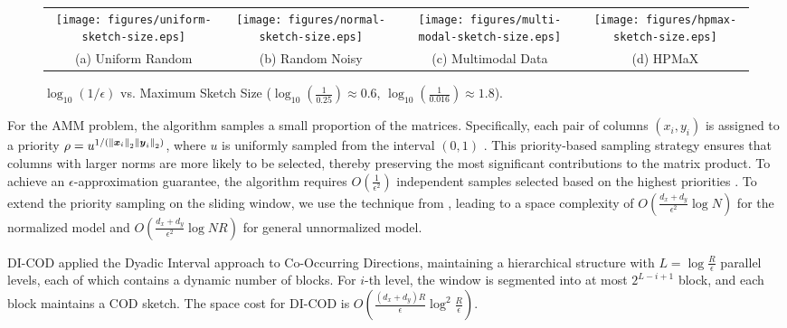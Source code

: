 \begin{figure*}[t]
	\centering
 \vspace{-2mm}
		\begin{tabular}{cccc}
			 \texttt{[image: figures/uniform-sketch-size.eps]} &
            		 \texttt{[image: figures/normal-sketch-size.eps]} &
			 \texttt{[image: figures/multi-modal-sketch-size.eps]} &
			 \texttt{[image: figures/hpmax-sketch-size.eps]}
			\\[-3mm]
             (a) Uniform Random &
                (b) Random Noisy &
			 (c) Multimodal Data &
			(d) HPMaX  \\[-1mm]
		\end{tabular}
		\vspace{-2mm}
		\caption{$\log_{10}(1/\epsilon)$ vs. Maximum Sketch Size ($\log_{10}(\frac{1}{0.25}) \approx 0.6$,  $\log_{10}(\frac{1}{0.016}) \approx 1.8$).}\label{fig:sketch-size}
		\vspace{-1mm}
\end{figure*}

 For the AMM problem, the algorithm samples a small proportion of the matrices. Specifically, each pair of columns $(x_i,y_i)$ is assigned to a priority $\rho=u^{1/(\left\|\boldsymbol{x}_i\right\|_2\left\|\boldsymbol{y}_i\right\|_2)}$, where $u$ is uniformly sampled from the interval $(0,1)$ \cite{efraimidis2006weighted}. This priority-based sampling strategy ensures that columns with larger norms are more likely to be selected, thereby preserving the most significant contributions to the matrix product. To achieve an $\epsilon$-approximation guarantee, the algorithm requires $O(\frac{1}{\epsilon^2})$ independent samples selected based on the highest priorities \cite{drineas2006fast, efraimidis2006weighted}. To extend the priority sampling on the sliding window, we use the technique from \cite{babcock2001sampling}, leading to a space complexity of $O(\frac{d_x+d_y}{\epsilon^2}\log{N})$ for the normalized model and $O(\frac{d_x+d_y}{\epsilon^2}\log{NR})$ for general unnormalized model.

 DI-COD applied the Dyadic Interval approach \cite{arasu2004approximate} to Co-Occurring Directions, maintaining a hierarchical structure with $L=\log{\frac{R}{\epsilon}}$ parallel levels, each of which contains a dynamic number of blocks. For $i$-th level, the window is segmented into at most $2^{L-i+1}$ block, and each block maintains a COD sketch. The space cost for DI-COD is $O(\frac{(d_x+d_y)R}{\epsilon}\log^2{\frac{R}{\epsilon}})$. 


